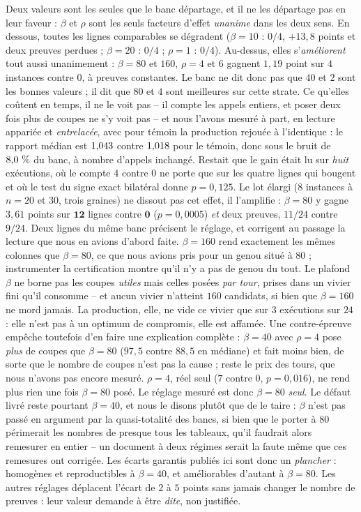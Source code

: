 \documentclass[11pt,a4paper]{article}
\theoremstyle{plain}
\theoremstyle{remark}
\begin{document}
Deux valeurs sont les seules que le banc départage, et il ne les départage
pas en leur faveur : $\beta$ et $\rho$ sont les seuls facteurs d'effet
\emph{unanime} dans les deux sens. En dessous, toutes les lignes
comparables se dégradent ($\beta=10$ : $0/4$, $+13{,}8$ points et deux
preuves perdues ; $\beta=20$ : $0/4$ ; $\rho=1$ : $0/4$). Au-dessus, elles
s'\emph{améliorent} tout aussi unanimement : $\beta=80$ et $160$, $\rho=4$
et $6$ gagnent $1{,}19$ point sur $4$ instances contre $0$, à preuves
constantes. Le banc ne dit donc pas que $40$ et $2$ sont les bonnes
valeurs ; il dit que $80$ et $4$ sont meilleures sur cette strate. Ce
qu'elles coûtent en temps, il ne le voit pas -- il compte les appels
entiers, et poser deux fois plus de coupes ne s'y voit pas -- et nous
l'avons mesuré à part, en lecture appariée et \emph{entrelacée}, avec pour
témoin la production rejouée à l'identique : le rapport médian est
$1{,}043$ contre $1{,}018$ pour le témoin, donc sous le bruit de
$8{,}0\ \%$ du banc, à nombre d'appels inchangé. Restait que le gain
était lu sur \emph{huit} exécutions, où le compte $4$ contre $0$ ne porte
que sur les quatre lignes qui bougent et où le test du signe exact bilatéral
donne $p=0{,}125$. Le lot élargi ($8$ instances à $n=20$ et $30$, trois
graines) ne dissout pas cet effet, il l'amplifie : $\beta=80$ y gagne
$3{,}61$ points sur $\mathbf{12}$ lignes contre $\mathbf{0}$
($p=0{,}0005$) \emph{et} deux preuves, $11/24$ contre $9/24$. Deux lignes du
même banc précisent le réglage, et corrigent au passage la lecture que nous
en avions d'abord faite. $\beta=160$ rend exactement les mêmes colonnes que
$\beta=80$, ce que nous avions pris pour un genou situé à $80$ ; instrumenter
la certification montre qu'il n'y a pas de genou du tout. Le plafond $\beta$
ne borne pas les coupes \emph{utiles} mais celles posées \emph{par tour},
prises dans un vivier fini qu'il consomme -- et aucun vivier n'atteint $160$
candidats, si bien que $\beta=160$ ne mord jamais. La production, elle, ne
vide ce vivier que sur $3$ exécutions sur $24$ : elle n'est pas à un optimum
de compromis, elle est affamée. Une contre-épreuve empêche toutefois d'en
faire une explication complète : $\beta=40$ avec $\rho=4$ pose \emph{plus} de
coupes que $\beta=80$ ($97{,}5$ contre $88{,}5$ en médiane) et fait moins
bien, de sorte que le nombre de coupes n'est pas la cause ; reste le prix
des tours, que nous n'avons pas encore mesuré. $\rho=4$, réel seul
($7$ contre $0$, $p=0{,}016$), ne rend plus rien une fois $\beta=80$ posé.
Le réglage mesuré est donc $\beta=80$ \emph{seul}. Le
défaut livré reste pourtant $\beta=40$, et nous le disons plutôt que de le
taire : $\beta$ n'est pas passé en argument par la quasi-totalité des bancs,
si bien que le porter à $80$ périmerait les nombres de presque tous les
tableaux, qu'il faudrait alors remesurer en entier -- un document à deux
régimes serait la faute même que ces remesures ont corrigée. Les écarts
garantis publiés ici sont donc un \emph{plancher} : homogènes et
reproductibles à $\beta=40$, et améliorables d'autant à $\beta=80$. Les
autres réglages déplacent l'écart de $2$ à $5$ points sans jamais changer le
nombre de preuves : leur valeur demande à être \emph{dite}, non justifiée.
\end{document}
